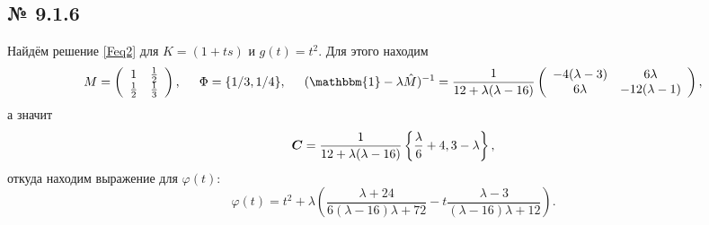 \subsection*{№ 9.1.6}

Найдём решение \eqref{Feq2} для $K = (1 + ts)$ и $g(t) = t^2$. 
Для этого находим
\begin{equation*}
	M = \left(
\begin{array}{cc}
 1 & \frac{1}{2} \\
 \frac{1}{2} & \frac{1}{3} \\
\end{array}
\right),
\hspace{5 mm} 
\Phi = \{1/3, 1/4\},
\hspace{5 mm} 
(\mathbbm{1} - \lambda \hat{M})^{-1} = 
\frac{1}{12 + \lambda (\lambda-16)}
\left(
\begin{array}{cc}
 -4 (\lambda -3) & 6 \lambda  \\
 6 \lambda  & -12 (\lambda -1) \\
\end{array}
\right)
,
\end{equation*}
а значит
\begin{equation*}
	\mbox{\boldmath $C$} = \frac{1}{12 + \lambda (\lambda-16)}\left\{\frac{\lambda }{6}+4,3-\lambda \right\},
\end{equation*}
откуда находим выражение для $\varphi(t)$:
\begin{equation*}
	\varphi(t) = t^2 + \lambda \left(\frac{\lambda +24}{6 (\lambda -16) \lambda +72}- t \frac{\lambda -3}{(\lambda -16) \lambda +12}\right).
\end{equation*}


